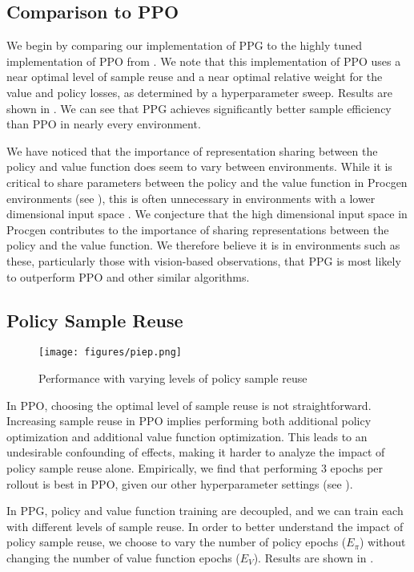 \documentclass{article}
\begin{document}
\subsection{Comparison to PPO}

We begin by comparing our implementation of PPG to the highly tuned implementation of PPO from \cite{procgen}. We note that this implementation of PPO uses a near optimal level of sample reuse and a near optimal relative weight for the value and policy losses, as determined by a hyperparameter sweep. Results are shown in . We can see that PPG achieves significantly better sample efficiency than PPO in nearly every environment.

We have noticed that the importance of representation sharing between the policy and value function does seem to vary between environments. While it is critical to share parameters between the policy and the value function in Procgen environments (see ), this is often unnecessary in environments with a lower dimensional input space \citep{sac}. We conjecture that the high dimensional input space in Procgen contributes to the importance of sharing representations between the policy and the value function. We therefore believe it is in environments such as these, particularly those with vision-based observations, that PPG is most likely to outperform PPO and other similar algorithms.

\subsection{Policy Sample Reuse} \label{sec:policy_sr}

\begin{figure*}
\centering
\texttt{[image: figures/piep.png]}
\caption{Performance with varying levels of policy sample reuse}
\label{fig:pi_sample_reuse}
\end{figure*}

In PPO, choosing the optimal level of sample reuse is not straightforward. Increasing sample reuse in PPO implies performing both additional policy optimization and additional value function optimization. This leads to an undesirable confounding of effects, making it harder to analyze the impact of policy sample reuse alone. Empirically, we find that performing 3 epochs per rollout is best in PPO, given our other hyperparameter settings (see ).

In PPG, policy and value function training are decoupled, and we can train each with different levels of sample reuse. In order to better understand the impact of policy sample reuse, we choose to vary the number of policy epochs ($E_{\pi}$) without changing the number of value function epochs ($E_V$). Results are shown in .
\end{document}
